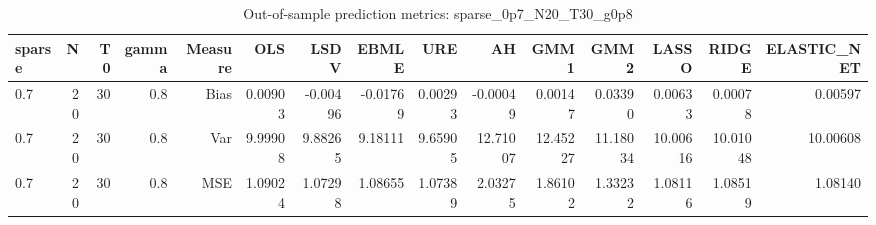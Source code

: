 \begin{table}[!htbp]\centering
\caption{Out-of-sample prediction metrics: sparse_0p7_N20_T30_g0p8}
\label{tab:table3_sparse_0p7_N20_T30_g0p8}
\begin{tabular}{lrrrrrrrrrrrrrr}
\hline
sparse & N & T0 & gamma & Measure & OLS & LSDV & EBMLE & URE & AH & GMM1 & GMM2 & LASSO & RIDGE & ELASTIC_NET \\
\hline
0.7 & 20 & 30 & 0.8 & Bias & 0.00903 & -0.00496 & -0.01769 & 0.00293 & -0.00049 & 0.00147 & 0.03390 & 0.00633 & 0.00078 & 0.00597 \\
0.7 & 20 & 30 & 0.8 & Var & 9.99908 & 9.88265 & 9.18111 & 9.65905 & 12.71007 & 12.45227 & 11.18034 & 10.00616 & 10.01048 & 10.00608 \\
0.7 & 20 & 30 & 0.8 & MSE & 1.09024 & 1.07298 & 1.08655 & 1.07389 & 2.03275 & 1.86102 & 1.33232 & 1.08116 & 1.08519 & 1.08140 \\
\hline
\end{tabular}
\end{table}

